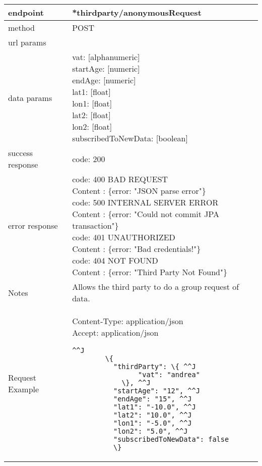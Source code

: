 \begin{tabularx}{\linewidth}{| l| l }
	\hline
	endpoint & *thirdparty/anonymousRequest \\
	\hline
	method & POST \\
	\hline
	url params & \\
	\hline
	data params &
	\parbox{0.7\textwidth}{
		\bigskip
		vat: [alphanumeric]\\
		startAge: [numeric]\\
		endAge: [numeric]\\
		lat1: [float]\\
		lon1: [float]\\
		lat2: [float]\\
		lon2: [float]\\
		subscribedToNewData: [boolean]
		\bigskip
	} \\
	\hline
	success response &
	\parbox{0.7\textwidth}{
		\bigskip
		code: 200
		\bigskip
	} \\
	\hline
	error response &
	\parbox{0.7\textwidth}{
		\bigskip
		code: 400 BAD REQUEST \\
		Content : \{error: "JSON parse error"\}\\
		code: 500 INTERNAL SERVER ERROR \\
		Content : \{error: "Could not commit JPA transaction"\}\\
		code: 401 UNAUTHORIZED \\
		Content : \{error: "Bad credentials!"\}\\
		code: 404 NOT FOUND \\
		Content : \{error: "Third Party Not Found"\}\\
		\bigskip
	} \\
	\hline
	Notes & 
	\parbox{0.7\textwidth}{
		\bigskip Allows the third party to do a group request of data.
	\bigskip}  \\
	\hline
	Request Example & 
		\parbox{0.8\textwidth}{
		\bigskip
		Content-Type: application/json \\
		Accept: application/json \\
		\bigskip
		\begin{lstlisting}^^J
		\{
		  "thirdParty": \{ ^^J
				"vat": "andrea"
			\}, ^^J
		  "startAge": "12", ^^J
		  "endAge": "15", ^^J
		  "lat1": "-10.0", ^^J
		  "lat2": "10.0", ^^J
		  "lon1": "-5.0", ^^J
		  "lon2": "5.0", ^^J
		  "subscribedToNewData": false
		  \}
		\end{lstlisting}
	} \\
		\hline
\end{tabularx}

